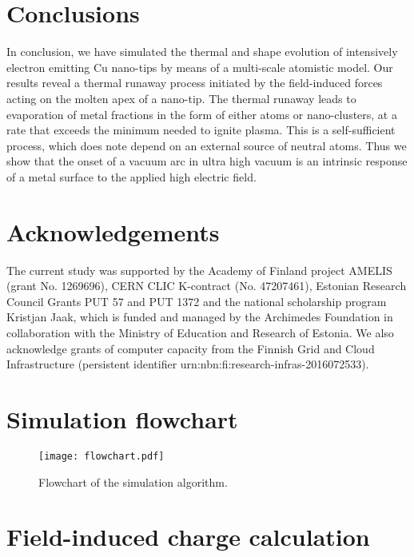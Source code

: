 \documentclass[%
 aps,
 prb,%
 amsmath,amssymb,
reprint,%
superscriptaddress,
]{revtex4-1}
\begin{document}
\section{Conclusions}

In conclusion, we have simulated the thermal and shape evolution of intensively electron emitting Cu nano-tips by means of a multi-scale atomistic model.
Our results reveal a thermal runaway process initiated by the field-induced forces acting on the molten apex of a nano-tip.
The thermal runaway leads to evaporation of metal fractions in the form of either atoms or nano-clusters, at a rate that exceeds the minimum needed to ignite plasma.
This is a self-sufficient process, which does note depend on an external source of neutral atoms.
Thus we show that the onset of a vacuum arc in ultra high vacuum is an intrinsic response of a metal surface to the applied high electric field.

\section*{Acknowledgements}

The current study was supported by the Academy of Finland project AMELIS (grant No. 1269696), CERN CLIC K-contract (No. 47207461), Estonian Research Council Grants PUT 57 and PUT 1372 and the national scholarship program Kristjan Jaak, which is funded and managed by the Archimedes Foundation in collaboration with the Ministry of Education and Research of Estonia. We also acknowledge grants of computer capacity from the Finnish Grid and
Cloud Infrastructure (persistent identifier urn:nbn:fi:research-infras-2016072533).

\pagebreak

\appendix

\section{Simulation flowchart}
\label{sec:flowchart}
\renewcommand\thefigure{\thesection.\arabic{figure}} 
\setcounter{figure}{0}  

\begin{figure}[!h]
	\centering
    \texttt{[image: flowchart.pdf]}
    \caption{Flowchart of the simulation algorithm.}
    \label{fig:flowchart}
\end{figure} 

\section{Field-induced charge calculation} \label{sec:charges}
\renewcommand\thefigure{\thesection.\arabic{figure}} 
\setcounter{figure}{0}  
\end{document}
